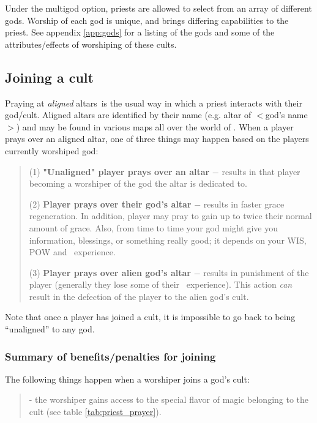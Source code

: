 {{{Under the multigod option, priests are allowed
to select from an array of different gods. Worship of each god is unique,
and brings differing capabilities to the priest.
See appendix \ref{app:gods} for a listing of the gods and some of the
attributes/effects of worshiping of these cults.


\subsection{Joining a cult}

Praying at {\em aligned} altars\ is the usual way
in which a priest interacts
with their god/cult. Aligned altars are identified by their name (e.g.
altar of $<$god's name$>$) and may be found in various maps all over the
world of \cf .
When a player prays over an aligned altar, one of three things may happen based
on the players currently worshiped god:
\begin{quote}

        (1) {\bf "Unaligned" player prays over an altar} $-$
	results in that player
        becoming a worshiper of the god the altar is dedicated to.

        (2) {\bf Player prays over their god's altar} $-$
	results in faster grace
        regeneration. In addition, player may pray to gain up to twice their
        normal amount of grace. Also, from time to time your god might
	give you information, blessings, or something really good; it depends
	on your WIS, POW and \priest\ experience.

        (3) {\bf Player prays over alien god's altar} $-$
	results in punishment
        of the player (generally they lose some of their \priest\ experience).
	This action {\em can} result in the defection of the player to the alien
	god's cult.
\end{quote}
Note that once a player has joined a cult, it is impossible to go back
to being ``unaligned'' to any god.


\subsubsection{Summary of benefits/penalties for joining}

The following things happen when a worshiper joins a god's cult:
\begin{quote}

- the worshiper gains access to the special flavor of magic belonging
to the cult (see table \ref{tab:priest_prayer}).


\end{quote}}}}
